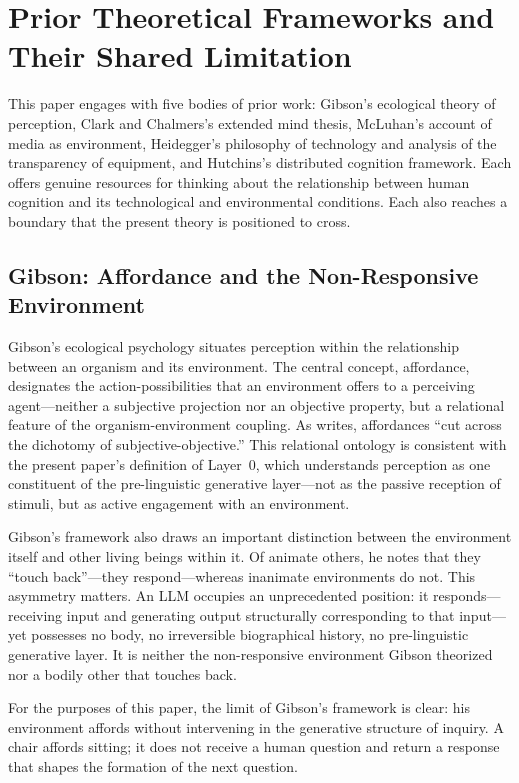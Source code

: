 \documentclass[12pt]{article}
\begin{document}
\section{Prior Theoretical Frameworks and Their Shared Limitation}

This paper engages with five bodies of prior work: Gibson's ecological theory of perception, Clark and Chalmers's extended mind thesis, McLuhan's account of media as environment, Heidegger's philosophy of technology and analysis of the transparency of equipment, and Hutchins's distributed cognition framework. Each offers genuine resources for thinking about the relationship between human cognition and its technological and environmental conditions. Each also reaches a boundary that the present theory is positioned to cross.

\subsection{Gibson: Affordance and the Non-Responsive Environment}

Gibson's ecological psychology situates perception within the relationship between an organism and its environment. The central concept, affordance, designates the action-possibilities that an environment offers to a perceiving agent---neither a subjective projection nor an objective property, but a relational feature of the organism-environment coupling. As \citet{gibson1979} writes, affordances ``cut across the dichotomy of subjective-objective.'' This relational ontology is consistent with the present paper's definition of Layer~0, which understands perception as one constituent of the pre-linguistic generative layer---not as the passive reception of stimuli, but as active engagement with an environment.

Gibson's framework also draws an important distinction between the environment itself and other living beings within it. Of animate others, he notes that they ``touch back''---they respond---whereas inanimate environments do not. This asymmetry matters. An LLM occupies an unprecedented position: it responds---receiving input and generating output structurally corresponding to that input---yet possesses no body, no irreversible biographical history, no pre-linguistic generative layer. It is neither the non-responsive environment Gibson theorized nor a bodily other that touches back.

For the purposes of this paper, the limit of Gibson's framework is clear: his environment affords without intervening in the generative structure of inquiry. A chair affords sitting; it does not receive a human question and return a response that shapes the formation of the next question.
\end{document}
